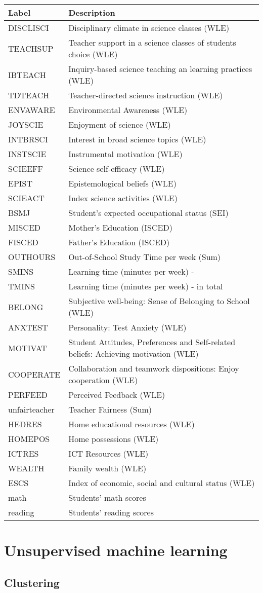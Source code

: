 \documentclass[]{book}
\begin{document}
\begin{longtable}[]{@{}ll@{}}
\toprule
Label & Description\tabularnewline
\midrule
\endhead
DISCLISCI & Disciplinary climate in science classes (WLE)\tabularnewline
TEACHSUP & Teacher support in a science classes of students choice (WLE)\tabularnewline
IBTEACH & Inquiry-based science teaching an learning practices (WLE)\tabularnewline
TDTEACH & Teacher-directed science instruction (WLE)\tabularnewline
ENVAWARE & Environmental Awareness (WLE)\tabularnewline
JOYSCIE & Enjoyment of science (WLE)\tabularnewline
INTBRSCI & Interest in broad science topics (WLE)\tabularnewline
INSTSCIE & Instrumental motivation (WLE)\tabularnewline
SCIEEFF & Science self-efficacy (WLE)\tabularnewline
EPIST & Epistemological beliefs (WLE)\tabularnewline
SCIEACT & Index science activities (WLE)\tabularnewline
BSMJ & Student's expected occupational status (SEI)\tabularnewline
MISCED & Mother's Education (ISCED)\tabularnewline
FISCED & Father's Education (ISCED)\tabularnewline
OUTHOURS & Out-of-School Study Time per week (Sum)\tabularnewline
SMINS & Learning time (minutes per week) - \tabularnewline
TMINS & Learning time (minutes per week) - in total\tabularnewline
BELONG & Subjective well-being: Sense of Belonging to School (WLE)\tabularnewline
ANXTEST & Personality: Test Anxiety (WLE)\tabularnewline
MOTIVAT & Student Attitudes, Preferences and Self-related beliefs: Achieving motivation (WLE)\tabularnewline
COOPERATE & Collaboration and teamwork dispositions: Enjoy cooperation (WLE)\tabularnewline
PERFEED & Perceived Feedback (WLE)\tabularnewline
unfairteacher & Teacher Fairness (Sum)\tabularnewline
HEDRES & Home educational resources (WLE)\tabularnewline
HOMEPOS & Home possessions (WLE)\tabularnewline
ICTRES & ICT Resources (WLE)\tabularnewline
WEALTH & Family wealth (WLE)\tabularnewline
ESCS & Index of economic, social and cultural status (WLE)\tabularnewline
math & Students' math scores\tabularnewline
reading & Students' reading scores\tabularnewline
\bottomrule
\end{longtable}

\hypertarget{unsupervised-machine-learning}{%
\chapter{Unsupervised machine learning}\label{unsupervised-machine-learning}}

\hypertarget{clustering}{%
\section{Clustering}\label{clustering}}
\end{document}
